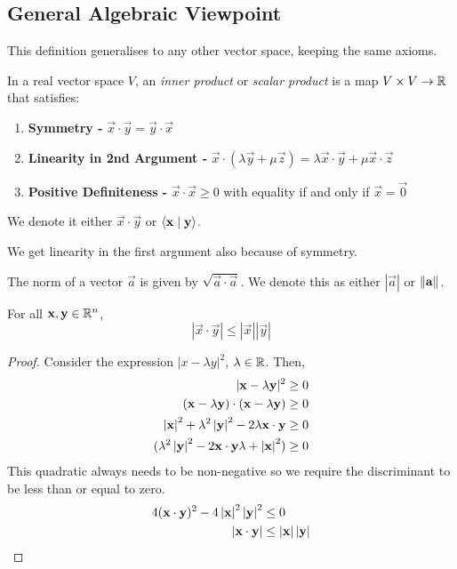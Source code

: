 \documentclass[../main.tex]{subfiles}
\begin{document}
\subsection{General Algebraic Viewpoint}
This definition generalises to any other vector space, keeping the same axioms.
\begin{definition}
  In a real vector space $V$, an \textit{inner product} or \textit{scalar product} is a map $V \times V \to \mathbb{R}$ that satisfies:
  \begin{enumerate}
    \item \textbf{Symmetry -} $\vec{x} \cdot \vec{y} = \vec{y} \cdot \vec{x}$
    \item \textbf{Linearity in 2nd Argument -} $\vec{x} \cdot(\lambda \vec{y} + \mu \vec{z}) = \lambda \vec{x} \cdot \vec{y} + \mu \vec{x} \cdot \vec{z}$
    \item \textbf{Positive Definiteness - } $\vec{x} \cdot \vec{x} \geq 0$ with equality if and only if $\vec{x} = \vec{0}$
  \end{enumerate}
  We denote it either $\vec{x} \cdot \vec{y}$ or $\langle \boldsymbol{\mathbf{x}} \mid \boldsymbol{\mathbf{y}} \rangle$.
\end{definition}
\begin{remark}[Note]
  We get linearity in the first argument also because of symmetry.
\end{remark}
\begin{definition}[Norm]
  The norm of a vector $\vec{a}$ is given by $\sqrt{\vec{a} \cdot \vec{a}}$.
  We denote this as either $|\vec{a}|$ or $\left\lVert \boldsymbol{\mathbf{a}} \right\rVert$.
\end{definition}
\begin{theorem}
  For all $\boldsymbol{\mathbf{x}}, \boldsymbol{\mathbf{y}} \in \mathbb{R}^{n}$,
  \[
    |\vec{x} \cdot \vec{y}| \leq |\vec{x}||\vec{y}|
  \]
\end{theorem}
\begin{proof}
  Consider the expression $|x - \lambda y|^2$, $\lambda \in \mathbb{R}$.
  Then,
  \begin{align*}
    |\boldsymbol{\mathbf{x}} - \lambda\boldsymbol{\mathbf{y}}|^2 &\geq 0 \\
    (\boldsymbol{\mathbf{x}} - \lambda \boldsymbol{\mathbf{y}}) \cdot (\boldsymbol{\mathbf{x}} - \lambda \boldsymbol{\mathbf{y}}) &\geq 0 \\
    \left\lvert \boldsymbol{\mathbf{x}} \right\rvert^2 + \lambda^2 \left\lvert \boldsymbol{\mathbf{y}} \right\rvert^2 - 2\lambda \boldsymbol{\mathbf{x}} \cdot \boldsymbol{\mathbf{y}} &\geq 0 \\
    (\lambda^2 \left\lvert \boldsymbol{\mathbf{y}} \right\rvert^2 - 2 \boldsymbol{\mathbf{x}} \cdot \boldsymbol{\mathbf{y}} \lambda + \left\lvert \boldsymbol{\mathbf{x}} \right\rvert^2) &\geq 0
  \end{align*}
  This quadratic always needs to be non-negative so we require the discriminant to be less than or equal to zero.
  \begin{align*}
    4(\boldsymbol{\mathbf{x}} \cdot \boldsymbol{\mathbf{y}})^2 - 4 \left\lvert \boldsymbol{\mathbf{x}} \right\rvert^2 \left\lvert \boldsymbol{\mathbf{y}} \right\rvert^2 &\leq 0 \\
    \left\lvert \boldsymbol{\mathbf{x}} \cdot \boldsymbol{\mathbf{y}} \right\rvert &\leq \left\lvert \boldsymbol{\mathbf{x}} \right\rvert \left\lvert \boldsymbol{\mathbf{y}} \right\rvert
  \end{align*}
\end{proof}
\end{document}
